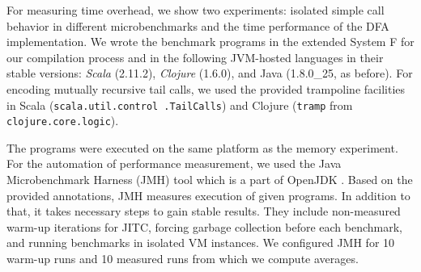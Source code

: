 For measuring time overhead, we show two experiments: isolated simple call behavior in 
different microbenchmarks and the time performance of the DFA implementation.
We wrote the benchmark programs in the extended System F for our
compilation process and in the following JVM-hosted languages in their
stable versions: \emph{Scala} (2.11.2)\cite{Odersky2014b}, 
\emph{Clojure} (1.6.0)\cite{Hickey2008}, and Java (1.8.0\_25, as before).
For encoding mutually recursive tail calls, we used the provided trampoline 
facilities in Scala (\texttt{scala.util.control .TailCalls}) and
Clojure (\texttt{tramp} from \texttt{clojure.core.logic}).

\noindent The programs were executed on the same platform as the memory experiment.
For the automation of performance measurement, we used the
Java Microbenchmark Harness (JMH) tool which is a part of OpenJDK
\cite{jmh}. Based on the provided annotations, JMH measures execution
of given programs. In addition to that, it takes necessary steps to
gain stable results. They include non-measured warm-up iterations for
JITC, forcing garbage collection before each benchmark, and running
benchmarks in isolated VM instances. We configured JMH for 10 warm-up
runs and 10 measured runs from which we compute averages.

